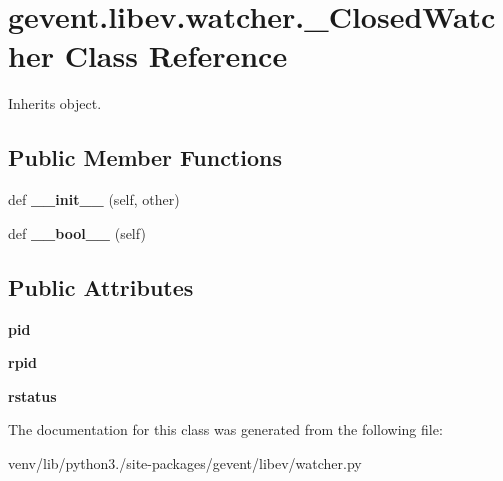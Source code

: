 \hypertarget{classgevent_1_1libev_1_1watcher_1_1___closed_watcher}{}\section{gevent.\+libev.\+watcher.\+\_\+\+Closed\+Watcher Class Reference}
\label{classgevent_1_1libev_1_1watcher_1_1___closed_watcher}


Inherits object.

\subsection*{Public Member Functions}
\begin{DoxyCompactItemize}
\item 
\mbox{\label{classgevent_1_1libev_1_1watcher_1_1___closed_watcher_ac908deb86004f06ac3e1d17eaccffe71}} 
def {\bfseries \+\_\+\+\_\+init\+\_\+\+\_\+} (self, other)
\item 
\mbox{\label{classgevent_1_1libev_1_1watcher_1_1___closed_watcher_a2101b7d5fb03896755512c7d124651de}} 
def {\bfseries \+\_\+\+\_\+bool\+\_\+\+\_\+} (self)
\end{DoxyCompactItemize}
\subsection*{Public Attributes}
\begin{DoxyCompactItemize}
\item 
\mbox{\label{classgevent_1_1libev_1_1watcher_1_1___closed_watcher_acbe9a31f510c936d5e7e820bb584ef91}} 
{\bfseries pid}
\item 
\mbox{\label{classgevent_1_1libev_1_1watcher_1_1___closed_watcher_a4971136f6e9b4b96a291c89045b4469d}} 
{\bfseries rpid}
\item 
\mbox{\label{classgevent_1_1libev_1_1watcher_1_1___closed_watcher_a17304a59029c624861a1b860869457ef}} 
{\bfseries rstatus}
\end{DoxyCompactItemize}


The documentation for this class was generated from the following file\+:\begin{DoxyCompactItemize}
\item 
venv/lib/python3./site-\/packages/gevent/libev/watcher.\+py\end{DoxyCompactItemize}
